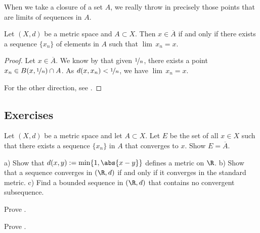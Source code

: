 \documentclass[12pt]{book}
\begin{document}
When we take a closure of a set $A$, we really throw in precisely 
those points that are limits of sequences in $A$.

\begin{prop} \label{prop:msclosureapprseq}
Let $(X,d)$ be a metric space and $A \subset X$.
Then $x \in \overline{A}$ if and only if there exists a sequence $\{ x_n \}$ of
elements in $A$ such that $\lim\, x_n = x$.
\end{prop}

\begin{proof}
Let $x \in \overline{A}$.
We know by
 that given $\nicefrac{1}{n}$, there
exists a point $x_n \in B(x,\nicefrac{1}{n}) \cap A$.
As $d(x,x_n) < \nicefrac{1}{n}$, we have $\lim\, x_n = x$.

For the other direction, see .
\end{proof}

\subsection*{Exercises}

\begin{exercise} \label{exercise:reverseclosedseq}
Let $(X,d)$ be a metric space and
let $A \subset X$.
Let $E$ be the set of all $x \in X$ such that there
exists a sequence $\{ x_n \}$ in $A$ that converges to $x$.
Show 
$E = \overline{A}$.
\end{exercise}

\begin{exercise}
a) Show that $d(x,y) := \min \{ 1, \abs{x-y} \}$ defines a metric on $\R$.
b) Show that a sequence converges in $(\R,d)$ if and only if it converges
in the standard metric.
c) Find a bounded sequence in $(\R,d)$ that
contains no convergent subsequence.
\end{exercise}

\begin{exercise}
Prove .
\end{exercise}

\begin{exercise}
Prove .
\end{exercise}
\end{document}

